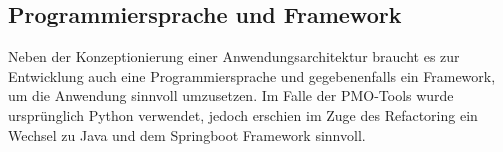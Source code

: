 \subsection{Programmiersprache und Framework}
Neben der Konzeptionierung einer Anwendungsarchitektur braucht es zur Entwicklung auch eine Programmiersprache und gegebenenfalls ein Framework, um die Anwendung sinnvoll umzusetzen. Im Falle der PMO-Tools wurde ursprünglich Python verwendet, jedoch erschien im Zuge des Refactoring ein Wechsel zu Java und dem Springboot Framework sinnvoll.
\pagebreak